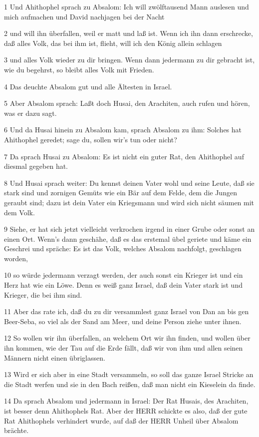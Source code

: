 \par 1 Und Ahithophel sprach zu Absalom: Ich will zwölftausend Mann auslesen und mich aufmachen und David nachjagen bei der Nacht
\par 2 und will ihn überfallen, weil er matt und laß ist. Wenn ich ihn dann erschrecke, daß alles Volk, das bei ihm ist, flieht, will ich den König allein schlagen
\par 3 und alles Volk wieder zu dir bringen. Wenn dann jedermann zu dir gebracht ist, wie du begehrst, so bleibt alles Volk mit Frieden.
\par 4 Das deuchte Absalom gut und alle Ältesten in Israel.
\par 5 Aber Absalom sprach: Laßt doch Husai, den Arachiten, auch rufen und hören, was er dazu sagt.
\par 6 Und da Husai hinein zu Absalom kam, sprach Absalom zu ihm: Solches hat Ahithophel geredet; sage du, sollen wir's tun oder nicht?
\par 7 Da sprach Husai zu Absalom: Es ist nicht ein guter Rat, den Ahithophel auf diesmal gegeben hat.
\par 8 Und Husai sprach weiter: Du kennst deinen Vater wohl und seine Leute, daß sie stark sind und zornigen Gemüts wie ein Bär auf dem Felde, dem die Jungen geraubt sind; dazu ist dein Vater ein Kriegsmann und wird sich nicht säumen mit dem Volk.
\par 9 Siehe, er hat sich jetzt vielleicht verkrochen irgend in einer Grube oder sonst an einen Ort. Wenn's dann geschähe, daß es das erstemal übel geriete und käme ein Geschrei und spräche: Es ist das Volk, welches Absalom nachfolgt, geschlagen worden,
\par 10 so würde jedermann verzagt werden, der auch sonst ein Krieger ist und ein Herz hat wie ein Löwe. Denn es weiß ganz Israel, daß dein Vater stark ist und Krieger, die bei ihm sind.
\par 11 Aber das rate ich, daß du zu dir versammlest ganz Israel von Dan an bis gen Beer-Seba, so viel als der Sand am Meer, und deine Person ziehe unter ihnen.
\par 12 So wollen wir ihn überfallen, an welchem Ort wir ihn finden, und wollen über ihn kommen, wie der Tau auf die Erde fällt, daß wir von ihm und allen seinen Männern nicht einen übriglassen.
\par 13 Wird er sich aber in eine Stadt versammeln, so soll das ganze Israel Stricke an die Stadt werfen und sie in den Bach reißen, daß man nicht ein Kieselein da finde.
\par 14 Da sprach Absalom und jedermann in Israel: Der Rat Husais, des Arachiten, ist besser denn Ahithophels Rat. Aber der HERR schickte es also, daß der gute Rat Ahithophels verhindert wurde, auf daß der HERR Unheil über Absalom brächte.
